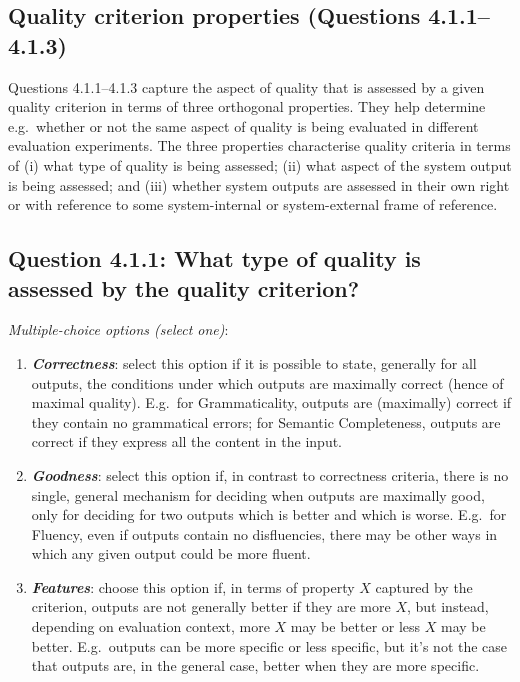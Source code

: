\documentclass[11pt,a4paper]{article}
\newcommand{\egcvalue}[1]{\textbf{\textit{#1}}}
\begin{document}
\subsection{Quality criterion properties (Questions 4.1.1--4.1.3)}

Questions 4.1.1--4.1.3 capture the aspect of quality that is assessed by a given quality criterion in terms of three orthogonal properties. They help determine e.g.\ whether or not the same aspect of quality is being evaluated in different evaluation experiments. The three properties characterise quality criteria in terms of (i) what type of quality is being assessed; (ii) what aspect of the system output is being assessed; and (iii) whether system outputs are assessed in their own right or with reference to some system-internal or system-external frame of reference.

\vspace{-.3cm}
\subsection*{Question 4.1.1:  What type of quality is assessed by the quality criterion?}
\vspace{-.1cm}

\vspace{.3cm}
\noindent\textit{Multiple-choice options (select one)}:  
\vspace{-.1cm}

\begin{enumerate}[itemsep=0cm,leftmargin=0.5cm,label={\LARGE $\circ$}]
    \item \egcvalue{Correctness}: select this option if it is possible to state,  generally for all outputs,  the conditions under which outputs are maximally correct (hence of maximal quality).  E.g.\ for Grammaticality, outputs are (maximally) correct if they contain no grammatical errors; for Semantic Completeness, outputs are correct if they express all the content in the input.
    \item \egcvalue{Goodness}: select this option if, in contrast to correctness criteria, there is no single, general mechanism for deciding when outputs are maximally good, only for deciding for two outputs which is better and which is worse. E.g.\ for Fluency, even if outputs contain no disfluencies, there may be other ways in which any given output could be more fluent.
    \item \egcvalue{Features}: choose this option if, in terms of property $X$ captured by the criterion, outputs are not generally better if they are more $X$, but instead, depending on evaluation context, more $X$ may be better or less $X$ may be better. E.g.\ outputs can be more specific or less specific, but it’s not the case that outputs are, in the general case, better when they are more specific.
\end{enumerate}
\end{document}
